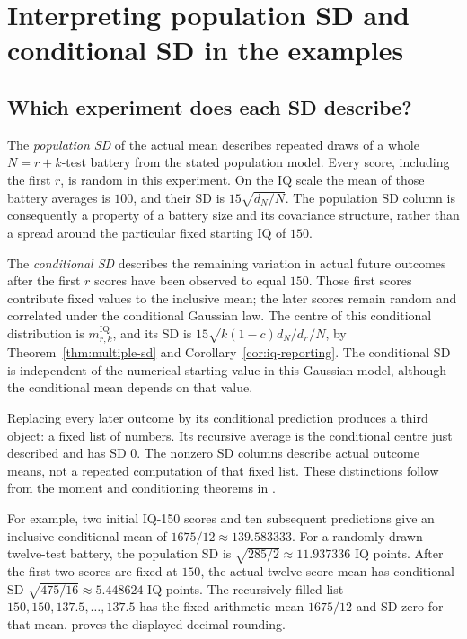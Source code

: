 \chapter{Interpreting population SD and conditional SD in the examples}
\label{sec:sd-interpretation}

\section{Which experiment does each SD describe?}
The \emph{population SD} of the actual mean describes repeated draws of a
whole \(N=r+k\)-test battery from the stated population model. Every
score, including the first \(r\), is random in this experiment. On the
IQ scale the mean of those battery averages is \(100\), and their SD is
\(15\sqrt{d_N/N}\). The population SD column is consequently a property
of a battery size and its covariance structure, rather than a spread around
the particular fixed starting IQ of \(150\).

The \emph{conditional SD} describes the remaining variation in actual
future outcomes after the first \(r\) scores have been observed to equal
\(150\). Those first scores contribute fixed values to the inclusive
mean; the later scores remain random and correlated under the conditional
Gaussian law. The centre of this conditional distribution is
\(m_{r,k}^{\mathrm{IQ}}\), and its SD is
\(15\sqrt{k(1-c)d_N/d_r}/N\), by
Theorem~\ref{thm:multiple-sd} and Corollary~\ref{cor:iq-reporting}.
The conditional SD is independent of the numerical starting value in this
Gaussian model, although the conditional mean depends on that value.

Replacing every later outcome by its conditional prediction produces a
third object: a fixed list of numbers. Its recursive average is the
conditional centre just described and has SD \(0\). The nonzero SD
columns describe actual outcome means, not a repeated computation of that
fixed list. These distinctions follow from the moment and conditioning
theorems in .

For example, two initial IQ-150 scores and ten subsequent predictions give
an inclusive conditional mean of \(1675/12\approx139.583333\).
For a randomly drawn twelve-test battery, the population SD is
\(\sqrt{285/2}\approx11.937336\) IQ points. After the first two scores
are fixed at \(150\), the actual twelve-score mean has conditional SD
\(\sqrt{475/16}\approx5.448624\) IQ points. The recursively filled list
\(150,150,137.5,\ldots,137.5\) has the fixed arithmetic mean
\(1675/12\) and SD zero for that mean. 
proves the displayed decimal rounding.

